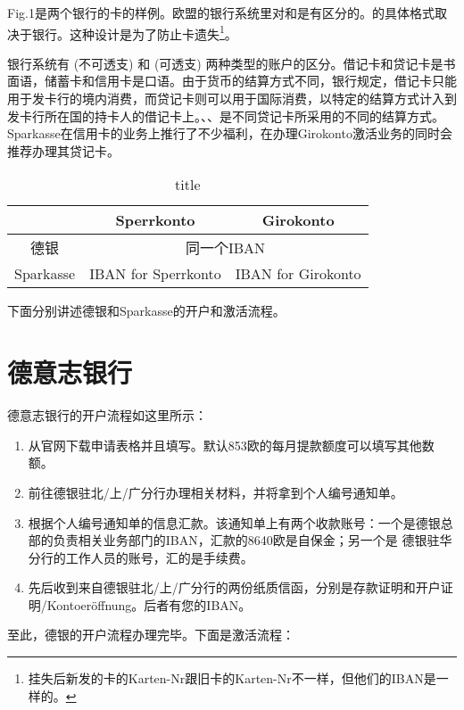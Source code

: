 Fig.1是两个银行的卡的样例。欧盟的银行系统里对和是有区分的。的具体格式取决于银行。这种设计是为了防止卡遗失\footnote{挂失后新发的卡的Karten-Nr跟旧卡的Karten-Nr不一样，但他们的IBAN是一样的。}。

银行系统有 (不可透支) 和 (可透支) 两种类型的账户的区分。借记卡和贷记卡是书面语，储蓄卡和信用卡是口语。由于货币的结算方式不同，银行规定，借记卡只能用于发卡行的境内消费，而贷记卡则可以用于国际消费，以特定的结算方式计入到发卡行所在国的持卡人的借记卡上。、、是不同贷记卡所采用的不同的结算方式。Sparkasse在信用卡的业务上推行了不少福利，在办理Girokonto激活业务的同时会推荐办理其贷记卡。

\begin{table}
\centering
\caption{title}
\begin{tabular}{|c|c|c|}
\hline
&Sperrkonto&Girokonto\\
\hline
德银&\multicolumn{2}{c|}{同一个IBAN}\\
\hline
Sparkasse&IBAN for Sperrkonto&IBAN for Girokonto\\
\hline
\end{tabular}
\end{table}

下面分别讲述德银和Sparkasse的开户和激活流程。

\section{德意志银行}

德意志银行的开户流程如这里所示：

\begin{enumerate}
  \item 从官网下载申请表格并且填写。默认853欧的每月提款额度可以填写其他数额。
  \item 前往德银驻北/上/广分行办理相关材料，并将拿到个人编号通知单。
  \item 根据个人编号通知单的信息汇款。该通知单上有两个收款账号：一个是德银总部的负责相关业务部门的IBAN，汇款的8640欧是自保金；另一个是 德银驻华分行的工作人员的账号，汇的是手续费。
  \item 先后收到来自德银驻北/上/广分行的两份纸质信函，分别是存款证明和开户证明/Kontoeröffnung。后者有您的IBAN。
\end{enumerate}

至此，德银的开户流程办理完毕。下面是激活流程：

